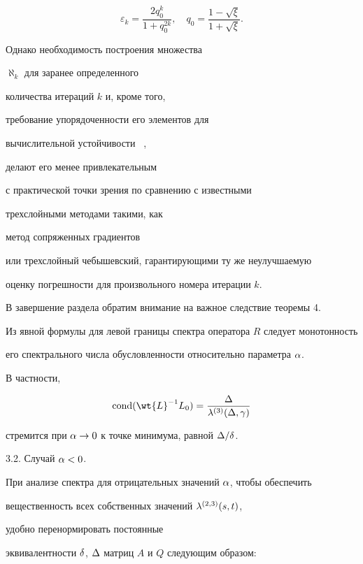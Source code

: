$$


\varepsilon_k = \dfrac{2 q_0^k}{1 + q_0^{2k}},\quad


q_0 = \dfrac{1 - \sqrt{\xi}}{1 + \sqrt{\xi}} .


$$


Однако необходимость построения множества


$\aleph_k$ для заранее определенного


количества итераций $k$ и, кроме того, 


требование упорядоченности его элементов для


вычислительной устойчивости ~\cite{SamNik},


\cite{LebPhin} делают его менее привлекательным


с практической точки зрения по сравнению с известными


трехслойными методами такими, как


метод сопряженных градиентов


или трехслойный чебышевский, гарантирующими ту же неулучшаемую


оценку погрешности для произвольного номера итерации $k$.





В завершение раздела обратим внимание на важное следствие теоремы 4.


Из явной формулы для левой границы спектра оператора $R$ следует монотонность


его спектрального числа обусловленности относительно параметра $\alpha$.


В частности,


$$


\cond(\wt{L}^{-1} L_0) =


\dfrac{\zD}{\zl^{(3)}(\zD,\zg)}


$$


стремится при $\alpha \rightarrow 0$ к точке минимума, равной $\Delta/\delta$.


\medskip





3.2. Случай $\alpha<0$.


При анализе спектра для отрицательных значений $\alpha$, чтобы обеспечить


вещественность всех собственных значений $\lambda^{(2,3)}(s,t)$,


удобно перенормировать постоянные


эквивалентности $\delta$, $\Delta$ матриц $A$ и $Q$ следующим образом:



